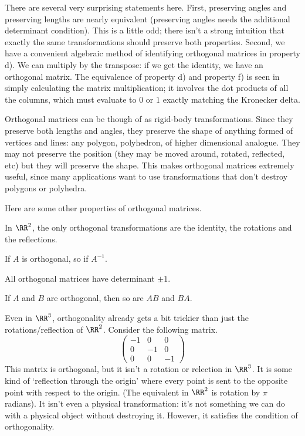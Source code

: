 \documentclass[fleqn]{report}
\begin{document}
There are several very surprising statements
here. First, preserving angles and preserving lengths 
are nearly equivalent (preserving angles needs the additional
determinant condition). This is a little odd; there
isn't a strong intuition that exactly the same transformations
should preserve both properties. Second, we have a 
convenient algebraic method of identifying orthogonal
matrices in property d). We can multiply by the transpose: if we get the
identity, we have an orthogonal matrix. The equivalence of
property d) and property f) is seen in simply calculating the
matrix multiplication; it involves the dot products of all the
columns, which must evaluate to $0$ or $1$ exactly matching
the Kronecker delta. 

Orthogonal matrices can be though of as rigid-body
transformations. Since they preserve both lengths and angles,
they preserve the shape of anything formed of vertices and
lines: any polygon, polyhedron, of higher dimensional
analogue. They may not preserve the position (they
may be moved around, rotated, reflected, etc) but they will
preserve the shape. This makes orthogonal matrices
extremely useful, since many applications want to use
transformations that don't destroy polygons or polyhedra.

\begin{prop}
Here are some other properties of orthogonal matrices.
\begin{smallitemize}
\item In $\RR^2$, the only orthogonal transformations are the
identity, the rotations and the reflections.
\item If $A$ is orthogonal, so if $A^{-1}$.
\item All orthogonal matrices have determinant $\pm 1$.
\item If $A$ and $B$ are orthogonal, then so are $AB$ and
$BA$. 
\end{smallitemize}
\end{prop}

Even in $\RR^3$, orthogonality already gets a bit trickier
than just the rotations/reflection of $\RR^2$. Consider
the following matrix.
\begin{equation*}
\left( \begin{matrix}
-1 & 0 & 0 \\
0 & -1 & 0 \\
0 & 0 & -1 
\end{matrix} \right) 
\end{equation*}
This matrix is orthogonal, but it isn't a rotation or
relection in $\RR^3$. It is some kind of
`reflection through the origin' where every point is sent to
the opposite point with respect to the origin. (The
equivalent in $\RR^2$ is rotation by $\pi$ radians). It isn't
even a physical transformation: it's not something we can do
with a physical object without destroying it. However, it
satisfies the condition of orthogonality.
\end{document}
